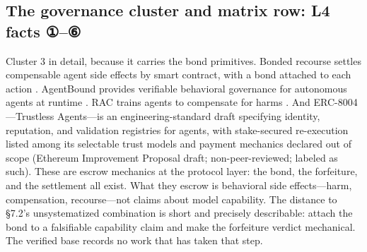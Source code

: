 \documentclass[11pt,a4paper]{article}
\begin{document}
\subsection{The governance cluster and matrix row: L4 facts ①–⑥}

Cluster 3 in detail, because it carries the bond primitives. Bonded recourse settles compensable agent side effects by smart contract, with a bond attached to each action \cite{key48}. AgentBound provides verifiable behavioral governance for autonomous agents at runtime \cite{key49}. RAC trains agents to compensate for harms \cite{key50}. And ERC-8004—Trustless Agents—is an engineering-standard draft specifying identity, reputation, and validation registries for agents, with stake-secured re-execution listed among its selectable trust models and payment mechanics declared out of scope \cite{key51} (Ethereum Improvement Proposal draft; non-peer-reviewed; labeled as such). These are escrow mechanics at the protocol layer: the bond, the forfeiture, and the settlement all exist. What they escrow is behavioral side effects—harm, compensation, recourse—not claims about model capability. The distance to §7.2's unsystematized combination is short and precisely describable: attach the bond to a falsifiable capability claim and make the forfeiture verdict mechanical. The verified base records no work that has taken that step.
\end{document}

